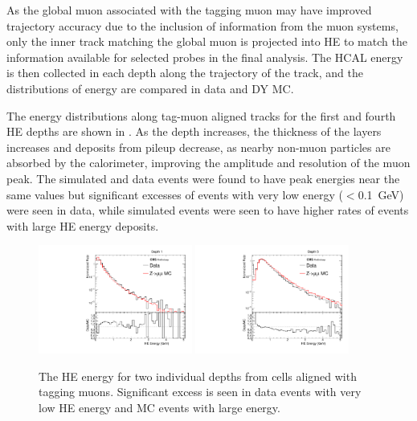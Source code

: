 As the global muon associated with the tagging muon may have improved trajectory accuracy due to the inclusion of information from the muon systems, only the inner track matching the global muon is projected into HE to match the information available for selected probes in the final analysis.
The HCAL energy is then collected in each depth along the trajectory of the track, and the distributions of energy are compared in data and DY MC.

The energy distributions along tag-muon aligned tracks for the first and fourth HE depths are shown in .
As the depth increases, the thickness of the layers increases and deposits from pileup decrease, as nearby non-muon particles are absorbed by the calorimeter, improving the amplitude and resolution of the muon peak.
The simulated and data events were found to have peak energies near the same values but significant excesses of events with very low energy ($<$\SI{0.1}{\giga\eV}) were seen in data, while simulated events were seen to have higher rates of events with large HE energy deposits.

\begin{figure}[htbp]
	\centering
	\includegraphics[width=0.45\textwidth]{figures/hcalAllE_depth0.pdf}
        \hspace{0.01\textwidth}
        \includegraphics[width=0.45\textwidth]{figures/hcalAllE_depth4.pdf}
        \caption[HE Energy Deposits Along Tag-Aligned Muons]{The HE energy for two individual depths from cells aligned with tagging muons. Significant excess is seen in data events with very low HE energy and MC events with large energy.}
        \label{fig:unCorrHEDepths}
\end{figure}

